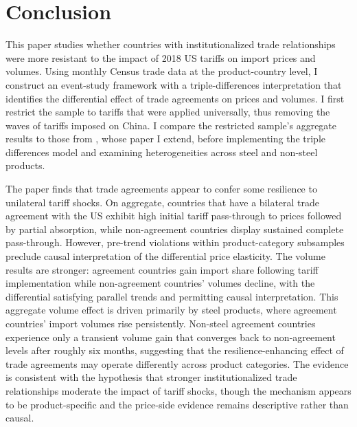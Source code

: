 \section{Conclusion}\label{sec:conclusion}


This paper studies whether countries with institutionalized trade relationships were more resistant to the impact of 2018 US tariffs on import prices and volumes. Using monthly Census trade data at the product-country level, I construct an event-study framework with a triple-differences interpretation that identifies the differential effect of trade agreements on prices and volumes. I first restrict the sample to tariffs that were applied universally, thus removing the waves of tariffs imposed on China. I compare the restricted sample's aggregate results to those from \textcite{amiti_whos_2020}, whose paper I extend, before implementing the triple differences model and examining heterogeneities across steel and non-steel products.  

The paper finds that trade agreements appear to confer some resilience to unilateral tariff shocks. On aggregate, countries that have a bilateral trade agreement with the US exhibit high initial tariff pass-through to prices followed by partial absorption, while non-agreement countries display sustained complete pass-through. However, pre-trend violations within product-category subsamples preclude causal interpretation of the differential price elasticity. The volume results are stronger: agreement countries gain import share following tariff implementation while non-agreement countries' volumes decline, with the differential satisfying parallel trends and permitting causal interpretation. This aggregate volume effect is driven primarily by steel products, where agreement countries' import volumes rise persistently. Non-steel agreement countries experience only a transient volume gain that converges back to non-agreement levels after roughly six months, suggesting that the resilience-enhancing effect of trade agreements may operate differently across product categories. The evidence is consistent with the hypothesis that stronger institutionalized trade relationships moderate the impact of tariff shocks, though the mechanism appears to be product-specific and the price-side evidence remains descriptive rather than causal.